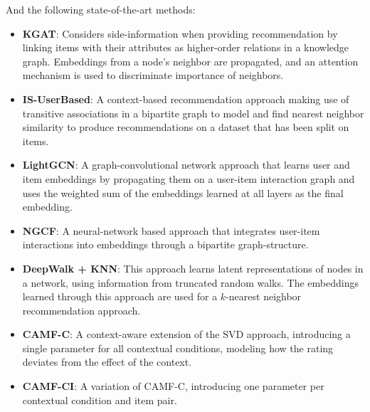 And the following state-of-the-art methods:
\begin{itemize}
    \item \textbf{KGAT}: Considers side-information when providing recommendation by linking items with their attributes as higher-order relations in a knowledge graph. Embeddings from a node's neighbor are propagated, and an attention mechanism is used to discriminate importance of neighbors.
    \item \textbf{IS-UserBased}: A context-based recommendation approach making use of transitive associations in a bipartite graph to model and find nearest neighbor similarity to produce recommendations on a dataset that has been split on items.
    \item \textbf{LightGCN}: A graph-convolutional network approach that learns user and item embeddings by propagating them on a user-item interaction graph and uses the weighted sum of the embeddings learned at all layers as the final embedding.
    \item \textbf{NGCF}: A neural-network based approach that integrates user-item interactions into embeddings through a bipartite graph-structure.
    \item \textbf{DeepWalk + KNN}: This approach learns latent representations of nodes in a network, using information from truncated random walks. The embeddings learned through this approach are used for a $k$-nearest neighbor recommendation approach.
    \item \textbf{CAMF-C}: A context-aware extension of the SVD approach, introducing a single parameter for all contextual conditions, modeling how the rating deviates from the effect of the context.
    \item \textbf{CAMF-CI}: A variation of CAMF-C, introducing one parameter per contextual condition and item pair.
\end{itemize}

